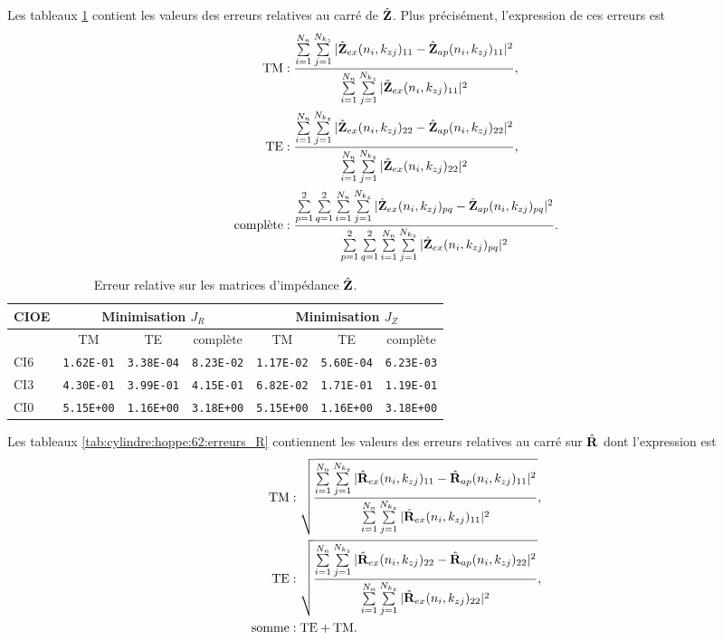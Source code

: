   \pagebreak
  Les tableaux \ref{tab:cylindre:hoppe:62:erreurs_Z} contient les valeurs des erreurs relatives au carré de \(\hat{\mathbf{Z}}\). 
  Plus précisément, l'expression de ces erreurs est 
  \begin{align*}
    \text{TM} &: \dfrac{\sum\limits_{i=1}^{N_n}\sum\limits_{j=1}^{N_{k_z}}|\hat{\mathbf{Z}}_{ex}(n_i,k_{zj})_{11}-\hat{\mathbf{Z}}_{ap}(n_i,k_{zj})_{11}|^2}{\sum\limits_{i=1}^{N_n}\sum\limits_{j=1}^{N_{k_z}}|\hat{\mathbf{Z}}_{ex}(n_i,k_{zj})_{11}|^2},
    \\
    \text{TE} &: \dfrac{\sum\limits_{i=1}^{N_n}\sum\limits_{j=1}^{N_{k_z}}|\hat{\mathbf{Z}}_{ex}(n_i,k_{zj})_{22}-\hat{\mathbf{Z}}_{ap}(n_i,k_{zj})_{22}|^2}{\sum\limits_{i=1}^{N_n}\sum\limits_{j=1}^{N_{k_z}}|\hat{\mathbf{Z}}_{ex}(n_i,k_{zj})_{22}|^2},
    \\
    \text{complète} &: \dfrac{\sum\limits_{p=1}^2\sum\limits_{q=1}^2\sum\limits_{i=1}^{N_n}\sum\limits_{j=1}^{N_{k_z}}|\hat{\mathbf{Z}}_{ex}(n_i,k_{zj})_{pq}-\hat{\mathbf{Z}}_{ap}(n_i,k_{zj})_{pq}|^2}{\sum\limits_{p=1}^2\sum\limits_{q=1}^2\sum\limits_{i=1}^{N_n}\sum\limits_{j=1}^{N_{k_z}}|\hat{\mathbf{Z}}_{ex}(n_i,k_{zj})_{pq}|^2}.
  \end{align*}

  \begin{table}[!hbt]
    \centering
    \begin{tabular}{l|ccc|ccc}
      CIOE & \multicolumn{3}{c}{Minimisation \(J_R\)} & \multicolumn{3}{c}{Minimisation \(J_Z\)}\\
      \hline
      \hline
          & {TM} & {TE} & {complète} & {TM} & {TE} & {complète}\\
      \hline
      CI6 & \verb|1.62E-01| & \verb|3.38E-04| & \verb|8.23E-02| & \verb|1.17E-02| & \verb|5.60E-04| & \verb|6.23E-03|\\
      CI3 & \verb|4.30E-01| & \verb|3.99E-01| & \verb|4.15E-01| & \verb|6.82E-02| & \verb|1.71E-01| & \verb|1.19E-01|\\
      CI0 & \verb|5.15E+00| & \verb|1.16E+00| & \verb|3.18E+00| & \verb|5.15E+00| & \verb|1.16E+00| & \verb|3.18E+00|
    \end{tabular}
    \caption{Erreur relative sur les matrices d'impédance \(\hat{\mathbf{Z}}\).}
    \label{tab:cylindre:hoppe:62:erreurs_Z}
  \end{table}

  Les tableaux \ref{tab:cylindre:hoppe:62:erreurs_R} contiennent les valeurs des erreurs relatives au carré sur \(\hat{\mathbf{R}}\) dont l'expression est 
  \begin{align*}
    \text{TM} &: \sqrt{\dfrac{\sum\limits_{i=1}^{N_n}\sum\limits_{j=1}^{N_{k_z}}|\hat{\mathbf{R}}_{ex}(n_i,k_{zj})_{11}-\hat{\mathbf{R}}_{ap}(n_i,k_{zj})_{11}|^2}{\sum\limits_{i=1}^{N_n}\sum\limits_{j=1}^{N_{k_z}}|\hat{\mathbf{R}}_{ex}(n_i,k_{zj})_{11}|^2}},
    \\
    \text{TE} &: \sqrt{\dfrac{\sum\limits_{i=1}^{N_n}\sum\limits_{j=1}^{N_{k_z}}|\hat{\mathbf{R}}_{ex}(n_i,k_{zj})_{22}-\hat{\mathbf{R}}_{ap}(n_i,k_{zj})_{22}|^2}{\sum\limits_{i=1}^{N_n}\sum\limits_{j=1}^{N_{k_z}}|\hat{\mathbf{R}}_{ex}(n_i,k_{zj})_{22}|^2}},
    \\
    \text{somme}  &: \text{TE} + \text{TM}.
  \end{align*}

